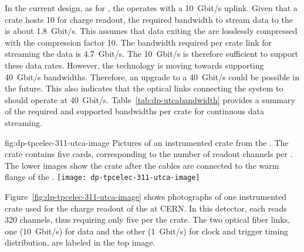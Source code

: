 In the current  design, as for , the  operates with a \SI{10}{Gbit/s} uplink. Given that a  crate hosts \num{10}  for charge readout, the required bandwidth to stream data to the  is about \SI{1.8}{Gbit/s}. This assumes that data exiting the  are losslessly compressed with the compression factor \num{10}. The bandwidth required per crate link for streaming the  data is \SI{4.7}{Gbit/s}. The \SI{10}{Gbit/s}  is therefore sufficient to support these data rates. However, the technology is moving towards  supporting \SI{40}{Gbit/s} bandwidths. Therefore, an upgrade to a \SI{40}{Gbit/s}  could be possible in the future. This also indicates that the optical links connecting the  system to   should operate at \SI{40}{Gbit/s}. Table~\ref{tab:dp-utcabandwidth} provides a summary of the required and supported bandwidths per  crate for continuous data streaming.


\begin{dunefigure}
{fig:dp-tpcelec-311-utca-image}
{Pictures of an instrumented  crate from the . The crate contains five  cards, corresponding to the number of readout channels per  . The lower images show the crate after the  cables are connected to the warm flange of the .}
\texttt{[image: dp-tpcelec-311-utca-image]}
\end{dunefigure}

Figure~\ref{fig:dp-tpcelec-311-utca-image} shows photographs of one instrumented  crate used for the charge readout of the  at CERN. In this detector, each  reads \num{320} channels, thus requiring only five  per the  crate. The two optical fiber links, one (\SI{10}{Gbit/s}) for data and the other (\SI{1}{Gbit/s}) for clock and trigger timing distribution, are labeled in the top image. 

